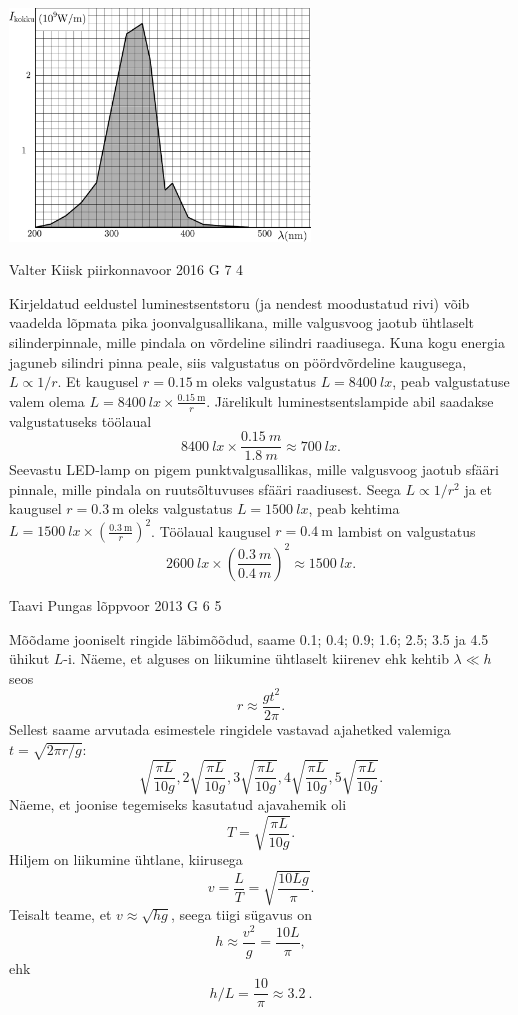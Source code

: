 \documentclass[11pt]{article}
\begin{document}
{{\begin{center}
	\includegraphics[width=80mm]{2011-lahg-04-intensity}
\end{center}
\fi
}

{Valter Kiisk} %
{piirkonnavoor} %
{2016} %
{G 7} %
{4} %
{

\ifSolution
Kirjeldatud eeldustel luminestsentstoru (ja nendest moodustatud rivi) võib vaadelda lõpmata pika joonvalgusallikana, mille valgusvoog jaotub ühtlaselt silinderpinnale, mille pindala on võrdeline silindri raadiusega. Kuna kogu energia jaguneb silindri pinna peale, siis valgustatus on pöördvõrdeline kaugusega, $L \propto 1/r$. Et kaugusel $r=\SI{0.15}{\meter}$ oleks valgustatus $L=\SI{8400}{lx}$, peab valgustatuse valem olema $L=\SI{8400}{lx}\times \frac{\SI{0.15}{\meter}} r$. Järelikult luminestsentslampide abil saadakse valgustatuseks töölaual
\[
\SI{8400}{lx}\times\frac{\SI{0.15}{m}}{\SI{1.8}{m}}\approx\SI{700}{lx}.
\]
Seevastu LED-lamp on pigem punktvalgusallikas, mille valgusvoog jaotub sfääri pinnale, mille pindala on ruutsõltuvuses sfääri raadiusest. Seega $L \propto 1/r^2$ ja et kaugusel $r=\SI{0.3}{\meter}$ oleks valgustatus $L=\SI{1500}{lx}$, peab kehtima $L=\SI{1500}{lx}\times \left(\frac{\SI{0.3}{\meter}} {r}\right)^2$. Töölaual kaugusel $r=\SI{0.4}{\meter}$ lambist on valgustatus
\[
\SI{2600}{lx}\times\left(\frac{\SI{0.3}{m}}{\SI{0.4}{m}}\right)^2\approx\SI{1500}{lx}.
\]
\fi
}

{Taavi Pungas} %
{lõppvoor} %
{2013} %
{G 6} %
{5} %
{

\ifSolution
Mõõdame jooniselt ringide läbimõõdud, saame \num{0,1}; \num{0,4}; \num{0,9}; \num{1,6}; \num{2,5}; \num{3,5} ja \num{4,5} ühikut $L$-i. Näeme, et alguses on liikumine ühtlaselt kiirenev ehk kehtib $\lambda \ll h$ seos
\[
r \approx \frac{gt^2}{2 \pi}.
\]
Sellest saame arvutada esimestele ringidele vastavad ajahetked valemiga $t = \sqrt{2 \pi r/g}$: 
\[
\sqrt{\frac{\pi L}{10 g}}, 2 \sqrt{\frac{\pi L}{10 g}}, 3 \sqrt{\frac{\pi L}{10 g}}, 4 \sqrt{\frac{\pi L}{10 g}}, 5 \sqrt{\frac{\pi L}{10 g}}.
\]
Näeme, et joonise tegemiseks kasutatud ajavahemik oli
\[
T=\sqrt{\frac{\pi L}{10 g}}.
\]
Hiljem on liikumine ühtlane, kiirusega
\[
v=\frac{L}{T}=\sqrt{\frac{10 L g}{\pi}}.
\]
Teisalt teame, et $v \approx \sqrt{hg}$, seega tiigi sügavus on
\[
h \approx \frac{v^2}{g} = \frac{10 L}{\pi},
\]
ehk 
\[
h/L = \frac{10}{\pi} \approx \SI{3,2}{}.
\]
\fi
}

}
\end{document}
